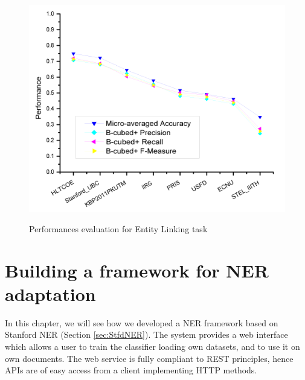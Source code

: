 \documentclass[a4paper,11pt]{report}
\begin{document}
\begin{figure}[htbp]
{\includegraphics[width=\textwidth/2]{kbp2011-optional_scores}}
\caption{Performances evaluation for Entity Linking task}
\label{fig:elresults}
\end{figure}
\chapter{Building a framework for NER adaptation}
\label{ch:pimp}
In this chapter, we will see how we developed a NER framework based on Stanford NER (Section \ref{sec:StfdNER}). The system provides a web interface which allows a user to train the classifier loading own datasets, and to use it on own documents. %
The web service is fully compliant to REST principles, %
hence APIs are of easy access from a client implementing HTTP methods. 
\end{document}
